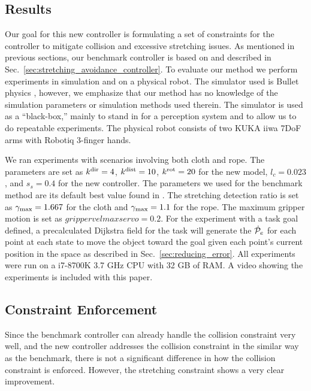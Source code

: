 \subsection{Results}
\label{sec:stretching_constraint_controller_results}

Our goal for this new controller is formulating a set of constraints for the controller to mitigate collision and excessive stretching issues. As mentioned in previous sections, our benchmark controller is based on \cite{Berenson2013} and described in Sec.~\ref{sec:stretching_avoidance_controller}. To evaluate our method we perform experiments in simulation and on a physical robot. The simulator used is Bullet physics \cite{Coumans2010}, however, we emphasize that our method has no knowledge of the simulation parameters or simulation methods used therein. The simulator is used as a ``black-box,'' mainly to stand in for a perception system and to allow us to do repeatable experiments. The physical robot consists of two KUKA iiwa 7DoF arms with Robotiq 3-finger hands.


We ran experiments with scenarios involving both cloth and rope. The parameters are set as $k^\textrm{dir} = 4$, $k^\textrm{dist} = 10$, $k^{\textrm{rot}} = 20$ for the new model, $l_c = 0.023$, and $s_s = 0.4$ for the new controller. The parameters we used for the benchmark method are its default best value found in \cite{McConachie2018}. The stretching detection ratio is set as $\gamma_{\textrm{max}} = 1.667$ for the cloth and $\gamma_{\textrm{max}} = 1.1$ for the rope. The maximum gripper motion is set as $grippervelmaxservo = 0.2$. For the experiment with a task goal defined, a precalculated Dijkstra field for the task will generate the $\dot{\mathcal{P}}_e$ for each point at each state to move the object toward the goal given each point's current position in the space as described in Sec.~\ref{sec:reducing_error}. All experiments were run on a i7-8700K 3.7 GHz CPU with 32 GB of RAM. A video showing the experiments is included with this paper.


\subsection{Constraint Enforcement}
\label{Results: Object Stretching Avoidance}

Since the benchmark controller can already handle the collision constraint very well, and the new controller addresses the collision constraint in the similar way as the benchmark, there is not a significant difference in how the collision constraint is enforced. However, the stretching constraint shows a very clear improvement.

